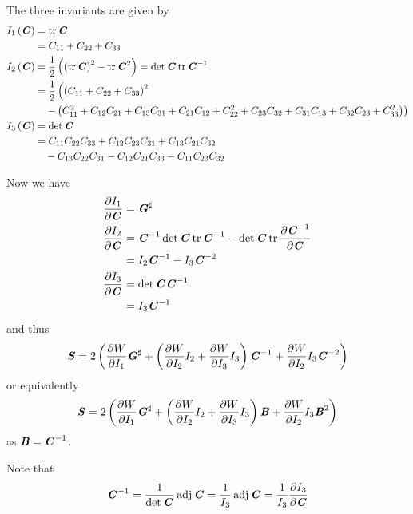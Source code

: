 The three invariants are given by
\begin{equation}
  \begin{split}
     I_{1}\left( \boldsymbol{\mathit{C}} \right)  &= \operatorname{tr}\boldsymbol{\mathit{C}} \\
    &= C_{11} + C_{22} + C_{33} \\
     I_{2}\left( \boldsymbol{\mathit{C}} \right)  &=
    \dfrac{1}{2}\left( \left( \operatorname{tr}\boldsymbol{\mathit{C}} \right)^{2}-\operatorname{tr}\boldsymbol{\mathit{C}}^{2} \right)
    = \det \boldsymbol{\mathit{C}}\operatorname{tr}{\boldsymbol{\mathit{C}}}^{-1}\\
    &=
    \dfrac{1}{2}\left(\left( C_{11}+C_{22}+C_{33} \right)^{2}\right. \\
      & \quad\left.-\left( C_{11}^{2}+C_{12}C_{21}+C_{13}C_{31}+
        C_{21}C_{12}+C_{22}^{2}+C_{23}C_{32}+C_{31}C_{13}+C_{32}C_{23}+C_{33}^{2} \right)\right) \\
     I_{3}\left( \boldsymbol{\mathit{C}} \right)  &= \det \boldsymbol{\mathit{C}} \\
    &=C_{11}C_{22}C_{33}+C_{12}C_{23}C_{31}+C_{13}C_{21}C_{32}\\
    &\quad-C_{13}C_{22}C_{31}-C_{12}C_{21}C_{33}-C_{11}C_{23}C_{32}
  \end{split}
\end{equation}

Now we have
\begin{align}
   \dfrac{\partial I_{1}}{\partial \boldsymbol{\mathit{C}}} &= \boldsymbol{\mathit{G}}^{\sharp} \\
   \dfrac{\partial I_{2}}{\partial \boldsymbol{\mathit{C}}} &={\boldsymbol{\mathit{C}}}^{-1}\det \boldsymbol{\mathit{C}}\operatorname{tr}{\boldsymbol{\mathit{C}}}^{-1}-\det \boldsymbol{\mathit{C}}\operatorname{tr} \dfrac{\partial {\ensuremath{\boldsymbol{\mathit{C}}}}^{-1}}{\partial \boldsymbol{\mathit{C}}} \\
  &=I_{2}{\boldsymbol{\mathit{C}}}^{-1}-I_{3} {\boldsymbol{\mathit{C}}}^{-2}  \\
   \dfrac{\partial I_{3}}{\partial \boldsymbol{\mathit{C}}} &=\det \boldsymbol{\mathit{C}}{\boldsymbol{\mathit{C}}}^{-1} \\
  &= I_{3}{\boldsymbol{\mathit{C}}}^{-1} 
\end{align}
and thus
\begin{equation}
  \boldsymbol{\mathit{S}}=2\left(  \dfrac{\partial W}{\partial I_{1}}  \boldsymbol{\mathit{G}}^{\sharp} +\left(  \dfrac{\partial W}{\partial I_{2}} I_{2}+ \dfrac{\partial W}{\partial I_{3}} I_{3} \right){\boldsymbol{\mathit{C}}}^{-1}+ \dfrac{\partial W}{\partial I_{2}} I_{3} {\boldsymbol{\mathit{C}}}^{-2}  \right)
\end{equation}
or equivalently
\begin{equation}
  \boldsymbol{\mathit{S}}=2\left(  \dfrac{\partial W}{\partial I_{1}}  \boldsymbol{\mathit{G}}^{\sharp} +\left(  \dfrac{\partial W}{\partial I_{2}} I_{2}+ \dfrac{\partial W}{\partial I_{3}} I_{3} \right)\boldsymbol{\mathit{B}}+ \dfrac{\partial W}{\partial I_{2}} I_{3}\boldsymbol{\mathit{B}}^{2} \right)
\end{equation}
as $\boldsymbol{\mathit{B}}={\boldsymbol{\mathit{C}}}^{-1}$.

Note that
\begin{equation}
  {\ensuremath{\boldsymbol{\mathit{C}}}}^{-1}=\dfrac{1}{\det \boldsymbol{\mathit{C}}}\operatorname{adj}\boldsymbol{\mathit{C}}=\dfrac{1}{I_{3}}\operatorname{adj}\boldsymbol{\mathit{C}}=\dfrac{1}{I_{3}} \dfrac{\partial I_{3}}{\partial \boldsymbol{\mathit{C}}} 
\end{equation}

